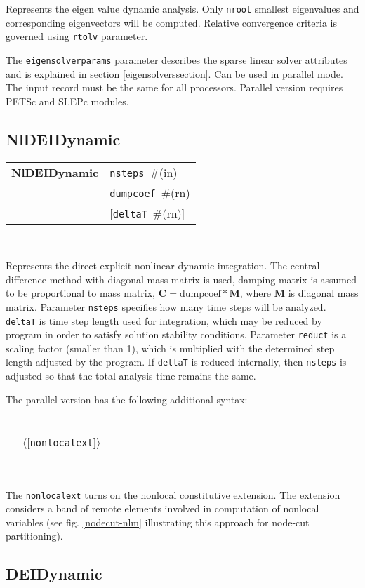 \documentclass[a4paper]{article}
\newcommand{\mbf}[1]{\boldsymbol{#1}}
\newcommand{\param}[1]{\texttt{#1}} %
\newcommand{\optional}[1]{[#1]} %
\newcommand{\field}[2]{\param{#1}~\#{\tiny(#2)}} %
\newcommand{\optField}[2]{\optional{\field{#1}{#2}}}
\newcommand{\optFieldnotype}[1]{[\param{#1}]}
\newcommand{\entKeywordInst}[1]{\textbf{#1}} %
\newcommand{\Pmode}[1]{{\sffamily #1}}
\newcommand{\oofemParallel}[1]{$\langle${#1}$\rangle$}
\newcommand{\PoptFieldnotype}[1]{\oofemParallel{\optFieldnotype{#1}}}
\newenvironment{record}[1][]{\begin{tabular}{|ll}}{\end{tabular}\\}
\newcommand{\recentry}[2]{{#1}&{#2}\\}
\newcounter{rcc}
\newenvironment{record}[1][\textwidth]{\setcounter{rcc}{0}\rowcolors{1}{lightgray}{lightgray}\tabularx{#1}{llR} \hline}
               {\endtabularx}
\newcommand{\recentry}[2]{\ifthenelse{\value{rcc}>0}{$\backslash$ \\}{\setcounter{rcc}{1}}{#1}&{#2}&}
\begin{document}
Represents the eigen value dynamic analysis.
Only \param{nroot} smallest eigenvalues and corresponding
eigenvectors will be computed. Relative convergence criteria is
governed using \param{rtolv} parameter.

The \param{eigensolverparams} parameter describes the sparse
linear solver attributes and is explained in section \ref{eigensolverssection}.
\Pmode{Can be used in parallel mode. The input record must be the same
for all processors. Parallel version requires PETSc and SLEPc modules.}


\subsection{NlDEIDynamic}
\label{NlDEIDynamic}
\begin{record}
  \recentry{\entKeywordInst{NlDEIDynamic}}{\field{nsteps}{in}}
  \recentry{}{\field{dumpcoef}{rn}}
  \recentry{}{\optField{deltaT}{rn}}
\end{record}

Represents the direct explicit  nonlinear dynamic  integration.
The central difference method with diagonal mass matrix is used,
damping matrix is assumed to be proportional to mass matrix, $\mbf{C}
= \mathrm{dumpcoef} * \mbf{M}$, where
$\mbf{M}$ is diagonal mass matrix.
Parameter \param{nsteps} specifies how many time steps will be analyzed.
\param{deltaT} is time step length used for integration, which may be reduced by program in order to satisfy solution stability conditions.
Parameter \param{reduct} is a scaling factor (smaller than 1), which is multiplied with the determined step length adjusted by the program.
If \param{deltaT} is reduced internally, then \param{nsteps} is adjusted so that the total analysis time remains the same.

The parallel version has the following additional syntax:\\ \\
\begin{record}
  \recentry{}{\PoptFieldnotype{nonlocalext}}
\end{record}

\noindent
\Pmode{
The \param{nonlocalext} turns on the nonlocal constitutive
extension. The extension considers a band of remote elements involved
in computation of nonlocal variables (see fig. \ref{nodecut-nlm} illustrating
this approach for node-cut partitioning).
}

\subsection{DEIDynamic}
\label{DEIDynamic}
\end{document}
